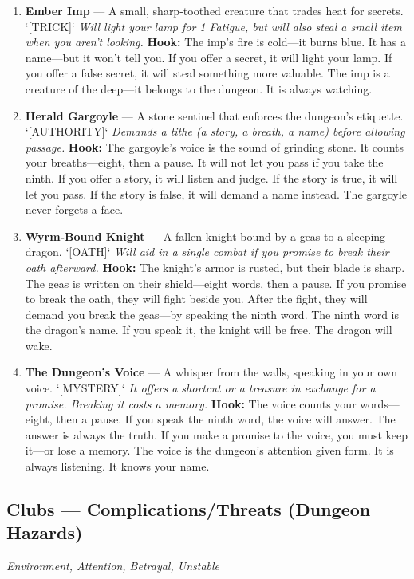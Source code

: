 \begin{enumerate}
\item[J] \textbf{Ember Imp} --- A small, sharp-toothed creature that trades heat for secrets. `[TRICK]`
  \hfill \textit{Will light your lamp for 1 Fatigue, but will also steal a small item when you aren't looking.}
  \textbf{Hook:} The imp's fire is cold---it burns blue. It has a name---but it won't tell you. If you offer a secret, it will light your lamp. If you offer a false secret, it will steal something more valuable. The imp is a creature of the deep---it belongs to the dungeon. It is always watching.

\item[Q] \textbf{Herald Gargoyle} --- A stone sentinel that enforces the dungeon's etiquette. `[AUTHORITY]`
  \hfill \textit{Demands a tithe (a story, a breath, a name) before allowing passage.}
  \textbf{Hook:} The gargoyle's voice is the sound of grinding stone. It counts your breaths---eight, then a pause. It will not let you pass if you take the ninth. If you offer a story, it will listen and judge. If the story is true, it will let you pass. If the story is false, it will demand a name instead. The gargoyle never forgets a face.

\item[K] \textbf{Wyrm-Bound Knight} --- A fallen knight bound by a geas to a sleeping dragon. `[OATH]`
  \hfill \textit{Will aid in a single combat if you promise to break their oath afterward.}
  \textbf{Hook:} The knight's armor is rusted, but their blade is sharp. The geas is written on their shield---eight words, then a pause. If you promise to break the oath, they will fight beside you. After the fight, they will demand you break the geas---by speaking the ninth word. The ninth word is the dragon's name. If you speak it, the knight will be free. The dragon will wake.

\item[A] \textbf{The Dungeon's Voice} --- A whisper from the walls, speaking in your own voice. `[MYSTERY]`
  \hfill \textit{It offers a shortcut or a treasure in exchange for a promise. Breaking it costs a memory.}
  \textbf{Hook:} The voice counts your words---eight, then a pause. If you speak the ninth word, the voice will answer. The answer is always the truth. If you make a promise to the voice, you must keep it---or lose a memory. The voice is the dungeon's attention given form. It is always listening. It knows your name.
\end{enumerate}

\subsection*{Clubs --- Complications/Threats (Dungeon Hazards)}
\noindent\textit{Environment, Attention, Betrayal, Unstable}

